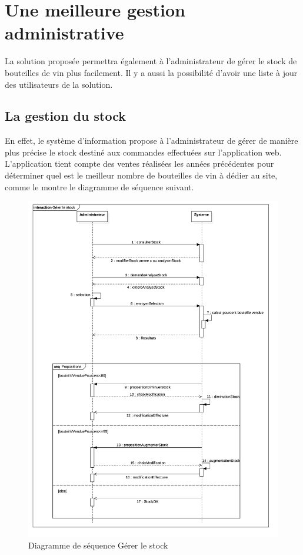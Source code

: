 \documentclass[a4paper, title]{report}
\begin{document}
\section{Une meilleure gestion administrative}\label{une-meilleure-gestion-administrative}

La solution proposée permettra également à l'administrateur de gérer le
stock de bouteilles de vin plus facilement. Il y a aussi la possibilité
d'avoir une liste à jour des utilisateurs de la solution.

\subsection{La gestion du stock}\label{la-gestion-du-stock}

En effet, le système d'information propose à l'administrateur de gérer
de manière plus précise le stock destiné aux commandes effectuées sur
l'application web. L'application tient compte des ventes réalisées les
années précédentes pour déterminer quel est le meilleur nombre de
bouteilles de vin à dédier au site, comme le montre le diagramme de
séquence suivant.

\begin{figure}
\centering
\includegraphics{Images/SequenceDiagramGererStock.jpg}
\caption{Diagramme de séquence Gérer le stock}
\end{figure}
\end{document}
